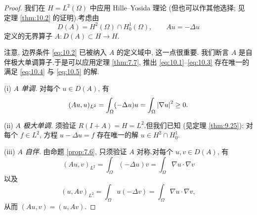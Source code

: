 \begin{proof}
我们在 $H=L^2(\Omega)$ 中应用 Hille--Yosida 理论 (但也可以作其他选择; 见
定理  \ref{thm:10.2} 的证明).考虑由
\begin{equation*}
D(A)=H^2(\Omega)\cap H_0^1(\Omega),\qquad Au=-\Delta u
\end{equation*}
定义的无界算子 $A:D(A)\subset H\to H$.

注意, 边界条件 \eqref{eq:10.2} 已被纳入 $A$ 的定义域中, 这一点很重要.
我们断言 $A$ 是自伴极大单调算子.于是可以应用定理  \ref{thm:7.7}, 推出
\eqref{eq:10.1}--\eqref{eq:10.3} 存在唯一的满足 \eqref{eq:10.4} 与
\eqref{eq:10.5} 的解.

(i) \emph{$A$ 单调.} 对每个 $u\in D(A)$, 有
\begin{equation*}
(Au,u)_{L^2}=\int_\Omega(-\Delta u)u=\int_\Omega\left|\nabla u\right|^2\ge0.
\end{equation*}

(ii) \emph{$A$ 极大单调.} 须验证 $R(I+A)=H=L^2$.但我们已知 (见定理
 \ref{thm:9.25}): 对每个 $f\in L^2$, 方程 $u-\Delta u=f$ 存在唯一的解
$u\in H^2\cap H_0^1$.

(iii) \emph{$A$ 自伴.} 由命题  \ref{prop:7.6}, 只须验证 $A$ 对称.对每个
$u,v\in D(A)$, 有
\begin{equation*}
(Au,v)_{L^2}=\int_\Omega(-\Delta u)v=\int_\Omega\nabla u\cdot\nabla v
\end{equation*}
以及
\begin{equation*}
(u,Av)_{L^2}=\int_\Omega u(-\Delta v)=\int_\Omega\nabla u\cdot\nabla v,
\end{equation*}
从而 $(Au,v)=(u,Av)$.


\end{proof}
